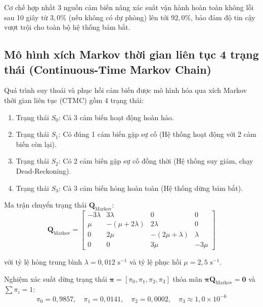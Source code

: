 Cơ chế hợp nhất 3 nguồn cảm biến nâng xác suất vận hành hoàn toàn không lỗi sau 10 giây từ $3{,}0\%$ (nếu không có dự phòng) lên tới $92{,}0\%$, bảo đảm độ tin cậy vượt trội cho toàn bộ hệ thống bám bắt.

\subsection{Mô hình xích Markov thời gian liên tục 4 trạng thái (Continuous-Time Markov Chain)}

\hspace{0.5cm} Quá trình suy thoái và phục hồi cảm biến được mô hình hóa qua xích Markov thời gian liên tục (CTMC) gồm 4 trạng thái:
\begin{enumerate}
    \item Trạng thái $S_0$: Cả 3 cảm biến hoạt động hoàn hảo.
    \item Trạng thái $S_1$: Có đúng 1 cảm biến gặp sự cố (Hệ thống hoạt động với 2 cảm biến còn lại).
    \item Trạng thái $S_2$: Có 2 cảm biến gặp sự cố đồng thời (Hệ thống suy giảm, chạy Dead-Reckoning).
    \item Trạng thái $S_3$: Cả 3 cảm biến hỏng hoàn toàn (Hệ thống dừng bám bắt).
\end{enumerate}

Ma trận chuyển trạng thái $\mathbf{Q}_{\text{Markov}}$:
\begin{equation}
\mathbf{Q}_{\text{Markov}} = \begin{bmatrix}
-3\lambda & 3\lambda & 0 & 0 \\
\mu & -(\mu + 2\lambda) & 2\lambda & 0 \\
0 & 2\mu & -(2\mu + \lambda) & \lambda \\
0 & 0 & 3\mu & -3\mu
\end{bmatrix}
\label{eq:markov-generator-matrix}
\end{equation}

với tỷ lệ hỏng trung bình $\lambda = 0{,}012\text{ s}^{-1}$ và tỷ lệ phục hồi $\mu = 2{,}5\text{ s}^{-1}$.

Nghiệm xác suất dừng trạng thái $\boldsymbol{\pi} = [\pi_0, \pi_1, \pi_2, \pi_3]$ thỏa mãn $\boldsymbol{\pi} \mathbf{Q}_{\text{Markov}} = \mathbf{0}$ và $\sum \pi_i = 1$:
\begin{equation}
\pi_0 = 0{,}9857, \quad \pi_1 = 0{,}0141, \quad \pi_2 = 0{,}0002, \quad \pi_3 \approx 1{,}0 \times 10^{-6}
\label{eq:steady-state-markov-probabilities}
\end{equation}

